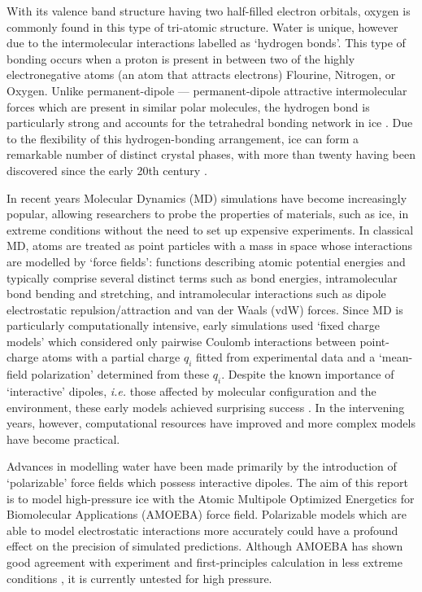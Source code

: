 \par
With its valence band structure having two half-filled electron orbitals, oxygen is commonly 
found in this type of tri-atomic structure.
Water is unique, however due to the intermolecular interactions labelled as `hydrogen bonds'.
This type of bonding occurs when a proton is present in between two of the highly electronegative
atoms (an atom that attracts electrons) Flourine, Nitrogen, or Oxygen.
Unlike permanent-dipole --- permanent-dipole attractive intermolecular forces which are present in similar
polar molecules, the hydrogen bond is particularly strong and accounts for the tetrahedral bonding
network in ice \cite{petrenko2002}.
Due to the flexibility of this hydrogen-bonding arrangement, ice can form a remarkable number of distinct
crystal phases, with more than twenty having been discovered since the early 20th century \cite{hansen2021}.

\par
In recent years Molecular Dynamics (MD) simulations have become increasingly popular, allowing researchers to 
probe the properties of materials, such as ice, in extreme conditions without the need to set up expensive experiments.
In classical MD, atoms are treated as point particles with a mass in space whose interactions are modelled by 
`force fields': functions describing atomic potential energies and typically comprise several distinct terms 
such as bond energies, intramolecular bond bending and stretching, and intramolecular interactions such as dipole 
electrostatic repulsion/attraction and van der Waals (vdW) forces.
Since MD is particularly computationally intensive, early simulations used `fixed charge models' which considered
only pairwise Coulomb interactions between point-charge atoms with a partial charge $q_i$ fitted from experimental data
and a `mean-field polarization' determined from these $q_i$. 
Despite the known importance of `interactive' dipoles, \textit{i.e.} those affected by molecular configuration and 
the environment, these early models achieved surprising success \cite{riniker2018}. 
In the intervening years, however, computational resources have improved and more complex models have become
practical.

\par
Advances in modelling water have been made primarily by the introduction of `polarizable' force fields which possess
interactive dipoles.
The aim of this report is to model high-pressure ice with the Atomic Multipole 
Optimized Energetics for Biomolecular Applications (AMOEBA) force field.
Polarizable models which are able to model electrostatic interactions more accurately could have a profound effect
on the precision of simulated predictions.
Although AMOEBA has shown good agreement with experiment and first-principles calculation in less extreme conditions 
\cite{ren2003}, it is currently untested for high pressure.


